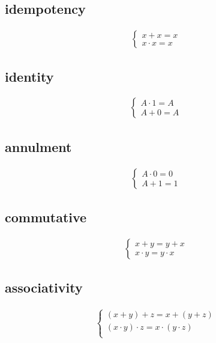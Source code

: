 \documentclass[a4paper,12pt]{article}
\begin{document}
\subsection{idempotency}
\label{sec:orgee24117}
\begin{lemma}
\begin{gather*}
  \begin{cases}
    x + x = x\\
    x \cdot x = x
  \end{cases}
\end{gather*}
\end{lemma}
\subsection{identity}
\label{sec:orgf70aa8f}
\begin{lemma}
\begin{gather*}
  \begin{cases}
    A \cdot 1 = A\\
    A + 0 = A
  \end{cases}
\end{gather*}
\end{lemma}
\subsection{annulment}
\label{sec:orgb37efbc}
\begin{lemma}
\begin{gather*}
  \begin{cases}
    A \cdot 0 = 0\\
    A + 1 = 1
  \end{cases}
\end{gather*}
\end{lemma}
\subsection{commutative}
\label{sec:orgd01e956}
\begin{lemma}
\begin{gather*}
  \begin{cases}
    x + y = y + x\\
    x \cdot y = y \cdot x
  \end{cases}
\end{gather*}
\end{lemma}
\subsection{associativity}
\label{sec:org4284a40}
\begin{lemma}
\begin{gather*}
  \begin{cases}
    (x + y) + z = x + (y + z)\\
    (x \cdot y) \cdot z = x \cdot (y \cdot z)\\
  \end{cases}
\end{gather*}
\end{lemma}
\end{document}
